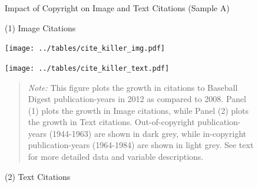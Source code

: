\begin{figure}[!htbp]
\begin{center}
\caption{Impact of Copyright on Image and Text Citations (Sample A)}
\label{fig:killer_img}
\caption*{(1) Image Citations}

\texttt{[image: ../tables/cite\_killer\_img.pdf]}

\vspace{0.2cm}
\caption*{(2) Text Citations}
\texttt{[image: ../tables/cite\_killer\_text.pdf]}

\vspace{5mm}

\end{center}

\begin{quote}

\emph{Note:} This figure plots the growth in citations to Baseball Digest publication-years in 2012 as compared to 2008. Panel (1) plots the growth in Image citations, while Panel (2) plots the growth in Text citations. Out-of-copyright publication-years (1944-1963) are shown in dark grey, while in-copyright publication-years (1964-1984) are shown in light grey. See text for more detailed data and variable descriptions. 


\end{quote}
\end{figure}

